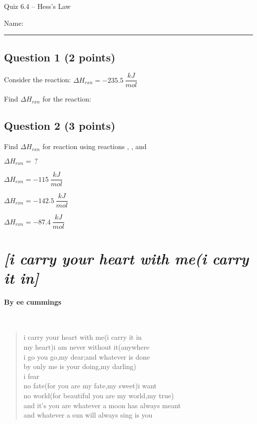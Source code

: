 \documentclass[11pt, letterpaper]{memoir}
\begin{document}
	\begin{center}
		{\large	Quiz 6.4 -- Hess's Law}
	\end{center}
{\large Name: \rule[-1mm]{4in}{.1pt}
	
	\subsection*{Question 1 (2 points)}
	Consider the reaction:  \hspace{1.5em} $\Delta H_{rxn} = -235.5~\dfrac{kJ}{mol}$
	
	\noindent
	Find $\Delta H_{rxn}$ for the reaction: 
	

	\vspace{6em}
	\subsection*{Question 2 (3 points)}
	Find $\Delta H_{rxn}$ for reaction \circled{$\star$} using reactions , , and 
	
	\circled{$\star$}  \hspace{1.5em} $\Delta H_{rxn} = ~?$
	
	  \hspace{1.5em} $\Delta H_{rxn} = -115~\dfrac{kJ}{mol}$
	
	  \hspace{1.5em} $\Delta H_{rxn} = -142.5~\dfrac{kJ}{mol}$
	
	  \hspace{1.5em} $\Delta H_{rxn} = -87.4~\dfrac{kJ}{mol}$
	
	
\newpage
\pagestyle{empty}
\addtocounter{page}{-1}
\newpage
\section*{\emph{[i carry your heart with me(i carry it in]}}
\paragraph{By ee cummings}~
\begin{verse}
	i carry your heart with me(i carry it in\\
	my heart)i am never without it(anywhere\\
	i go you go,my dear;and whatever is done\\
	by only me is your doing,my darling)\\
	\hspace{14em} i fear\\
	no fate(for you are my fate,my sweet)i want\\
	no world(for beautiful you are my world,my true)\\
	and it’s you are whatever a moon has always meant\\
	and whatever a sun will always sing is you


\end{verse}}
\end{document}
